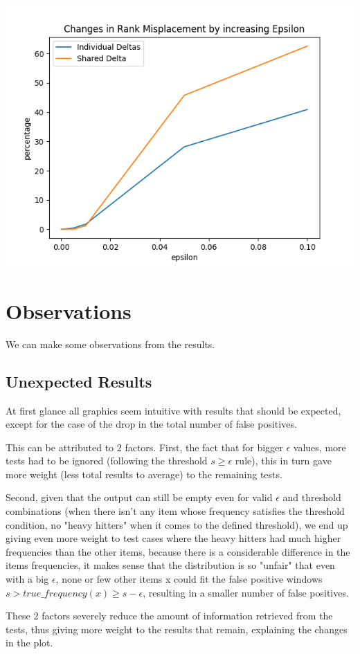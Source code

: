 \documentclass[...]{revdetua}
\begin{document}
\includegraphics[scale=0.5]{rank misplacement.png}

\section{Observations}
We can make some observations from the results.
\subsection{Unexpected Results}
At first glance all graphics seem intuitive with results that should be expected, except for the case of the drop in the total number of false positives.
\par
This can be attributed to 2 factors.
First, the fact that for bigger $\epsilon$ values, more tests had to be ignored (following the threshold $s \geq \epsilon$ rule), this in turn gave more weight (less total results to average) to the remaining tests.\par
Second, given that the output can still be empty even for valid $\epsilon$ and threshold combinations (when there isn't any item whose frequency satisfies the threshold condition, no "heavy hitters" when it comes to the defined threshold), we end up giving even more weight to test cases where the heavy hitters had much higher frequencies than the other items, because there is a considerable difference in the items frequencies, it makes sense that the distribution is so "unfair" that even with a big $\epsilon$, none or few other items x could fit the false positive windows $s > true\_frequency(x) \geq s-\epsilon$, resulting in a smaller number of false positives.\par
These 2 factors severely reduce the amount of information retrieved from the tests, thus giving more weight to the results that remain, explaining the changes in the plot.
\end{document}
